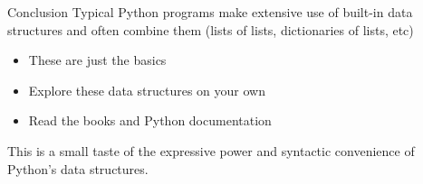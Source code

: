 \documentclass[smaller, aspectratio=1610]{beamer}
\begin{document}
\begin{frame}[label={sec:orgb419c6d}]{Conclusion}
Typical Python programs make extensive use of built-in data structures and often combine them (lists of lists, dictionaries of lists, etc)

\begin{itemize}
\item These are just the basics
\item Explore these data structures on your own
\item Read the books and Python documentation
\end{itemize}


This is a small taste of the expressive power and syntactic convenience of Python's data structures.
\end{frame}
\end{document}
